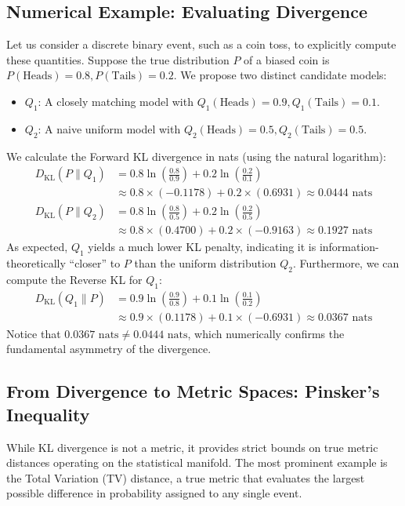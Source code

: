 \subsection{Numerical Example: Evaluating Divergence}
Let us consider a discrete binary event, such as a coin toss, to explicitly compute these quantities. Suppose the true distribution $P$ of a biased coin is $P(\text{Heads}) = 0.8, P(\text{Tails}) = 0.2$. We propose two distinct candidate models:
\begin{itemize}
    \item $Q_1$: A closely matching model with $Q_1(\text{Heads}) = 0.9, Q_1(\text{Tails}) = 0.1$.
    \item $Q_2$: A naive uniform model with $Q_2(\text{Heads}) = 0.5, Q_2(\text{Tails}) = 0.5$.
\end{itemize}
We calculate the Forward KL divergence in nats (using the natural logarithm):
\begin{align*}
D_{\text{KL}}(P \parallel Q_1) &= 0.8 \ln\left(\frac{0.8}{0.9}\right) + 0.2 \ln\left(\frac{0.2}{0.1}\right) \\
&\approx 0.8 \times (-0.1178) + 0.2 \times (0.6931) \approx 0.0444 \text{ nats}
\end{align*}
\begin{align*}
D_{\text{KL}}(P \parallel Q_2) &= 0.8 \ln\left(\frac{0.8}{0.5}\right) + 0.2 \ln\left(\frac{0.2}{0.5}\right) \\
&\approx 0.8 \times (0.4700) + 0.2 \times (-0.9163) \approx 0.1927 \text{ nats}
\end{align*}
As expected, $Q_1$ yields a much lower KL penalty, indicating it is information-theoretically ``closer'' to $P$ than the uniform distribution $Q_2$. Furthermore, we can compute the Reverse KL for $Q_1$:
\begin{align*}
D_{\text{KL}}(Q_1 \parallel P) &= 0.9 \ln\left(\frac{0.9}{0.8}\right) + 0.1 \ln\left(\frac{0.1}{0.2}\right) \\
&\approx 0.9 \times (0.1178) + 0.1 \times (-0.6931) \approx 0.0367 \text{ nats}
\end{align*}
Notice that $0.0367 \text{ nats} \ne 0.0444 \text{ nats}$, which numerically confirms the fundamental asymmetry of the divergence.

\subsection{From Divergence to Metric Spaces: Pinsker's Inequality}

While KL divergence is not a metric, it provides strict bounds on true metric distances operating on the statistical manifold. The most prominent example is the Total Variation (TV) distance, a true metric that evaluates the largest possible difference in probability assigned to any single event.

